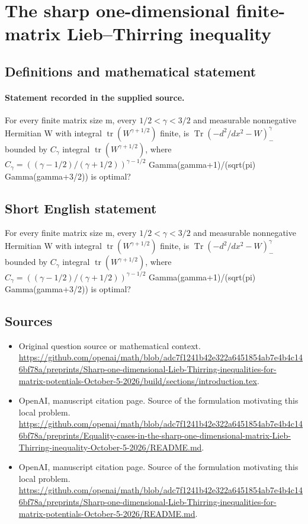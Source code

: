 \documentclass[11pt]{article}
\begin{document}
\section*{The sharp one-dimensional finite-matrix Lieb–Thirring inequality}\label{statement}
\subsection{Definitions and mathematical statement}
\paragraph{Statement recorded in the supplied source.}
For every finite matrix size m, every $1/2<\gamma <3/2$ and measurable nonnegative Hermitian W with integral $\operatorname{tr}(W^{\gamma +1/2})$ finite, is $\operatorname{Tr}(-d^2/dx^2-W)_-^\gamma $ bounded by $C_\gamma $ integral $\operatorname{tr}(W^{\gamma +1/2})$, where $C_\gamma =((\gamma -1/2)/(\gamma +1/2))^{\gamma -1/2}$ Gamma(gamma+1)/(sqrt(pi) Gamma(gamma+3/2)) is optimal?
\subsection{Short English statement}
For every finite matrix size m, every $1/2<\gamma <3/2$ and measurable nonnegative Hermitian W with integral $\operatorname{tr}(W^{\gamma +1/2})$ finite, is $\operatorname{Tr}(-d^2/dx^2-W)_-^\gamma $ bounded by $C_\gamma $ integral $\operatorname{tr}(W^{\gamma +1/2})$, where $C_\gamma =((\gamma -1/2)/(\gamma +1/2))^{\gamma -1/2}$ Gamma(gamma+1)/(sqrt(pi) Gamma(gamma+3/2)) is optimal?
\subsection{Sources}
\begin{itemize}
\item[S1] Original question source or mathematical context.
\url{https://github.com/openai/math/blob/adc7f1241b42e322a6451854ab7e4b4c146bf78a/preprints/Sharp-one-dimensional-Lieb-Thirring-inequalities-for-matrix-potentials-October-5-2026/build/sections/introduction.tex}.
\item[S2] OpenAI, manuscript citation page. Source of the formulation motivating this local problem.
\url{https://github.com/openai/math/blob/adc7f1241b42e322a6451854ab7e4b4c146bf78a/preprints/Equality-cases-in-the-sharp-one-dimensional-matrix-Lieb-Thirring-inequality-October-5-2026/README.md}.
\item[S3] OpenAI, manuscript citation page. Source of the formulation motivating this local problem.
\url{https://github.com/openai/math/blob/adc7f1241b42e322a6451854ab7e4b4c146bf78a/preprints/Sharp-one-dimensional-Lieb-Thirring-inequalities-for-matrix-potentials-October-5-2026/README.md}.
\end{itemize}
\end{document}
